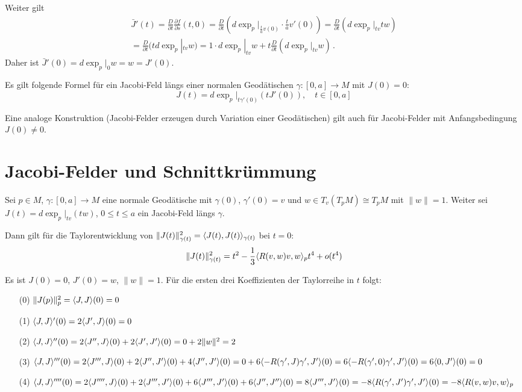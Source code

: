 \documentclass[a4paper,twoside,DIV15,BCOR12mm]{scrbook}
\begin{document}
\begin{beispiel}
\begin{beweis}
Weiter gilt
\begin{multline*}
\bar J'(t) = \frac D {\partial t} \frac {\partial f}{\partial s} (t,0) = \frac D {\partial t}(d\exp_p|_{\frac t a v(0)} \cdot \frac t a v'(0))  = \frac D{\partial t} (d\exp_p|_{tv} tw) \\ = \frac D{\partial t}( t d\exp_p|_{tv} w) = 1\cdot d\exp_p|_{tv} w + t \frac D{\partial t}(d\exp_p|_{tv} w)\,.
\end{multline*}
Daher ist $\bar J'(0) = d\exp_p|_0 w = w = J'(0)$.
\end{beweis}

\begin{bemerkungen}
\item Es gilt folgende Formel für ein Jacobi-Feld längs einer normalen Geodätischen $\gamma:[0,a] \to M$ mit $J(0) = 0$:
\[
J(t) = d\exp_p|_{t\gamma'(0)} (tJ'(0)),\quad t\in[0,a]
\]

\item Eine analoge Konstruktion (Jacobi-Felder erzeugen durch Variation einer Geodätischen) gilt auch für Jacobi-Felder mit Anfangsbedingung $J(0)\ne 0$.
\end{bemerkungen}

\section{Jacobi-Felder und Schnittkrümmung}

\begin{satz}
Sei $p\in M$, $\gamma:[0,a]\to M$ eine normale Geodätische mit $\gamma(0)$, $\gamma'(0)=v$ und $w \in T_v(T_pM) \cong T_pM$ mit $\|w\| = 1$.  Weiter sei $J(t) = d\exp_p|_{tv}(tw)$, $0\le t \le a$ ein Jacobi-Feld längs $\gamma$.

Dann gilt für die Taylorentwicklung von $\|J(t)\|^2_{\gamma(t)} = \langle J(t),J(t)\rangle_{\gamma(t)}$ bei $t=0$:
\[
\|J(t)\|_{\gamma(t)}^2 = t^2 - \frac 13 \langle R(v,w)v,w\rangle_p t^4 + o(t^4)
\]
\end{satz}

\begin{beweis}
Es ist $J(0)=0$, $J'(0) = w$, $\|w\|=1$. Für die ersten drei Koeffizienten der Taylorreihe in $t$ folgt:
\begin{enumerate}
\item[(0)] $\|J(p)\|_p^2 = \langle J,J\rangle (0) = 0$
\item[(1)] $\langle J,J\rangle '(0) = 2\langle J',J\rangle(0) = 0$
\item[(2)] $\langle J,J\rangle''(0) = 2\langle J'',J\rangle(0) + 2 \langle J',J'\rangle(0) = 0 + 2\|w\|^2 = 2$
\item[(3)] $\langle J,J\rangle'''(0) = 2\langle J''',J\rangle (0) + 2 \langle J'',J'\rangle (0) + 4 \langle J'',J'\rangle(0) = 0 + 6 \langle-R(\gamma',J)\gamma',J'\rangle(0) = 6 \langle-R(\gamma',0)\gamma',J'\rangle(0) = 6 \langle0,J'\rangle(0) = 0$
\item[(4)] $\langle J,J\rangle ''''(0) = 2 \langle J'''',J\rangle(0) + 2 \langle J''',J'\rangle(0) + 6 \langle J''',J'\rangle(0) + 6 \langle J'',J''\rangle(0) = 8 \langle J''',J'\rangle(0) = -8 \langle R(\gamma',J')\gamma',J'\rangle(0) = -8 \langle R(v,w)v,w\rangle_p$


\end{enumerate}
\end{beweis}
\end{beispiel}
\end{document}
